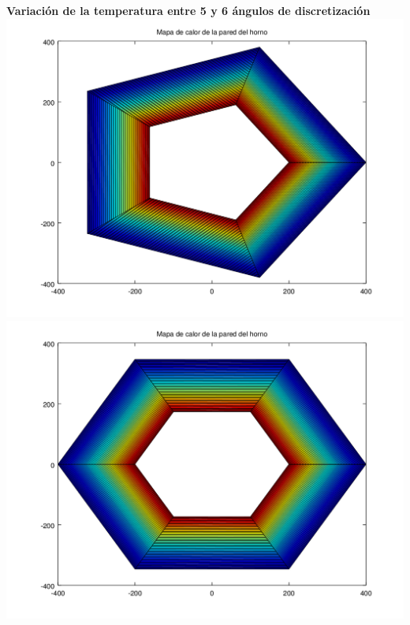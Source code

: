 \begin{enumerate}
	  	\textbf{Variación de la temperatura entre 5 y 6 ángulos de discretización}\\
	  	\includegraphics[scale=0.35]{experimentos1a_1b/evolucion_posicion_isoterma_temperatura/variacion_angulos_radio_fijo_se_suaviza_isoterma/test10_050_radios_005_angulos_inst_001_heatmap.png}
		\includegraphics[scale=0.35]{experimentos1a_1b/evolucion_posicion_isoterma_temperatura/variacion_angulos_radio_fijo_se_suaviza_isoterma/test10_050_radios_006_angulos_inst_001_heatmap.png}	  	


\end{enumerate}
